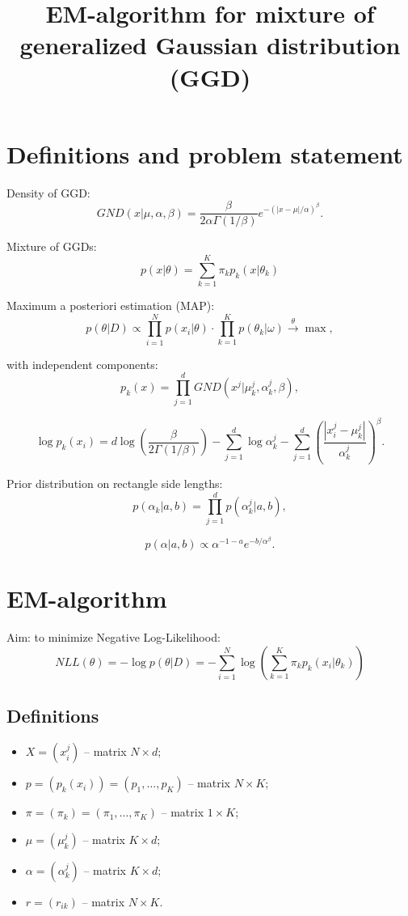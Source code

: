 \documentclass[12pt]{article}
\title{EM-algorithm for mixture of generalized Gaussian distribution (GGD)}
\author{}
\date{}
\theoremstyle{definition}
\theoremstyle{plain}
\begin{document}
\maketitle
\thispagestyle{empty}

\section{Definitions and problem statement}
Density of GGD:
$$
GND(x | \mu, \alpha, \beta) = \frac{\beta}{2 \alpha \Gamma(1/\beta)} 
e^{-(|x - \mu|/\alpha)^{\beta}}.
$$

Mixture of GGDs:
$$
p(x | \theta) = \sum_{k = 1}^{K} \pi_k p_k(x | \theta_k)
$$

Maximum a posteriori estimation (MAP):
$$
p(\theta | D) \propto 
\prod_{i = 1}^N p(x_i | \theta) \cdot 
\prod_{k = 1}^K p(\theta_k | \omega) \xrightarrow{\theta} \max,
$$

with independent components:
$$
p_k(x) = \prod_{j = 1}^{d} GND(x^j | \mu^j_k, \alpha^j_k, \beta),
$$

$$
\log p_k(x_i) = d \log \left( \frac{\beta}{2 \Gamma(1/\beta)} \right) - 
\sum_{j=1}^d \log \alpha_k^j - 
\sum_{j=1}^d \left( \frac{|x_i^j - \mu_k^j|}{\alpha_k^j} \right)^\beta .
$$

Prior distribution on rectangle side lengths:
$$
p(\alpha_k | a, b) = \prod_{j = 1}^d p(\alpha^j_k | a, b),
$$

$$
p(\alpha | a, b) \propto \alpha^{-1 - a} e^{-b / \alpha^\beta}.
$$

\section{EM-algorithm}

Aim: to minimize Negative Log-Likelihood:
$$
NLL(\theta) = -\log p(\theta | D) = -\sum_{i = 1}^N \log{ \left( \sum_{k = 1}^{K} \pi_k p_k(x_i | \theta_k) \right)}
$$

\subsection{Definitions}
\begin{itemize}
\item $X = (x_i^j)$ -- matrix $N \times d$;
\item $p = (p_k(x_i)) = (p_1, \ldots, p_K)$ -- matrix $N \times K$;
\item $\pi = (\pi_k) = (\pi_1, \ldots, \pi_K)$ -- matrix $1 \times K$;
\item $\mu = (\mu_k^j)$ -- matrix $K \times d$;
\item $\alpha = (\alpha_k^j)$ -- matrix $K \times d$;
\item $r = (r_{ik})$ -- matrix $N \times K$.
\end{itemize}
\end{document}
